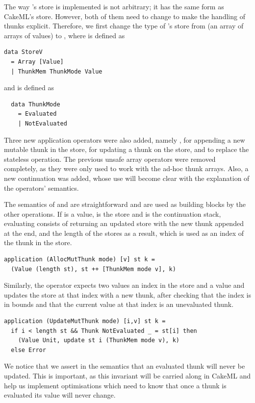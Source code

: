 The way \StateLang{}'s store is implemented is not arbitrary; it has the same
form as CakeML's store. However, both of them need to change to make the
handling of thunks explicit. Therefore, we first change the type of
\StateLang{}'s store from \hsinl{[[Value]]} (an array of arrays of values) to
\hsinl{[StoreV]}, where  is defined as
\begin{verbatim}
data StoreV
  = Array [Value]
  | ThunkMem ThunkMode Value
\end{verbatim}
and  is defined as
\begin{verbatim}
  data ThunkMode
    = Evaluated
    | NotEvaluated
\end{verbatim}
Three new application operators were also added, namely ,
for appending a new mutable thunk in the store,  for
updating a thunk on the store, and  to replace the
stateless  operation. The previous unsafe array operators were
removed completely, as they were only used to work with the ad-hoc thunk arrays.
Also, a new continuation  was added, whose use will become
clear with the explanation of the operators' semantics.

The semantics of  and  are
straightforward and are used as building blocks by the other operations. If
 is a value,  is the store and  is the continuation stack,
evaluating  consists of returning an updated store with the
new thunk appended at the end, and the length of the stores as a 
result, which is used as an index of the thunk in the store.
\begin{verbatim}
application (AllocMutThunk mode) [v] st k =
  (Value (length st), st ++ [ThunkMem mode v], k)
\end{verbatim}
Similarly, the  operator expects two values an index in
the store and a value and updates the store at that index with a new thunk,
after checking that the index is in bounds and that the current value at that
index is an unevaluated thunk.
\begin{verbatim}
application (UpdateMutThunk mode) [i,v] st k =
  if i < length st && Thunk NotEvaluated _ = st[i] then
    (Value Unit, update st i (ThunkMem mode v), k)
  else Error
\end{verbatim}
We notice that we assert in the semantics that an evaluated thunk will never be
updated. This is important, as this invariant will be carried along in CakeML
and help us implement optimisations which need to know that once a thunk is
evaluated its value will never change.

